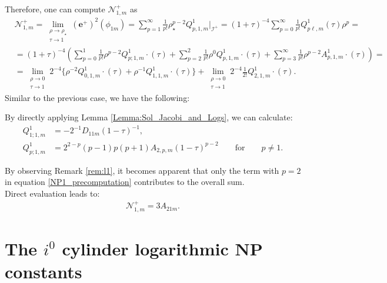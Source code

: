 Therefore, one can compute $\mathcal{N}^{+}_{1,m}$ as
\begin{align}\label{NP1_precomputation}
  & \mathcal{N}^{+}_{1,m}= \lim_{\substack{\rho \to \rho_{\star} \\ \tau \to 1}} (\boldsymbol{e}^{+})^2(\phi_{1m}) = \sum_{p=1}^{\infty}\frac{1}{p!}\rho_{\star}^{p-2}Q^{1}_{p,1,m}|_{\mathscr{I}^{+}} =  (1+\tau)^{-4} \sum_{p=0}^{\infty} \frac{1}{p !} Q_{p \ell, m}^{1}(\tau) \rho^{p} = \nonumber \\
  & = (1+\tau)^{-4}\left(\sum_{p=0}^{1} \frac{1}{p !} \rho^{p-2} Q_{p; 1, m}^{1}\cdot(\tau)+\sum_{p=2}^{2} \frac{1}{p !} \rho^{0} Q_{p, 1, m}^{1}\cdot(\tau)+\sum_{p=3}^{\infty} \frac{1}{p !} \rho^{p-2} A_{p, 1, m}^{1}\cdot{(\tau)}\right) = \nonumber \\
  & = \lim _{\substack{\rho \rightarrow 0 \\ \tau \rightarrow 1}} 2^{-4}\big\{\rho^{-2} Q_{0,1, m}^{1}\cdot(\tau)+\rho^{-1} Q_{1,1, m}^{1}\cdot(\tau)\big\}+\lim_{\substack{\rho \rightarrow 0 \\ \tau \rightarrow 1}} 2^{-4} \frac{1}{2 !} Q^{1}_{2, 1, m}\cdot(\tau). 
\end{align}
Similar to the previous case, we have the following:
\begin{remark}\label{rem:l1}
  By directly applying Lemma \ref{Lemma:Sol_Jacobi_and_Logs}, we can calculate: 
 \begin{align}
   Q^{1}_{1;1,m} &=-2^{-1}D_{11m}(1-\tau)^{-1},\\
   Q^{1}_{p;1,m} &=2^{2-p}(p-1)p(p+1)A_{2,p,m}(1-\tau)^{p-2} \qquad
   \text{for}\qquad p\neq 1.
 \end{align}
\end{remark}
\pagebreak
By observing Remark \ref{rem:l1}, it becomes apparent that only the term with $p=2$ in equation \eqref{NP1_precomputation} contributes to the overall sum. \\
Direct evaluation leads to:
\begin{align}
  \mathcal{N}^{+}_{1,m}=3A_{21m}.
\end{align}
\section{The $i^0$ cylinder logarithmic NP constants}
\label{sec:LogarithmicNP_main}

